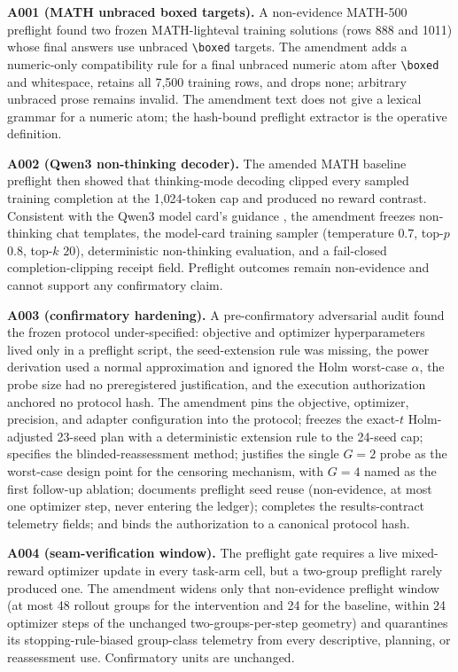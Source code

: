 \documentclass[11pt]{article}
\begin{document}
\textbf{A001 (MATH unbraced boxed targets).} A non-evidence MATH-500 preflight found two frozen MATH-lighteval training solutions (rows 888 and 1011) whose final answers use unbraced \verb|\boxed| targets. The amendment adds a numeric-only compatibility rule for a final unbraced numeric atom after \verb|\boxed| and whitespace, retains all 7{,}500 training rows, and drops none; arbitrary unbraced prose remains invalid. The amendment text does not give a lexical grammar for a numeric atom; the hash-bound preflight extractor is the operative definition.

\textbf{A002 (Qwen3 non-thinking decoder).} The amended MATH baseline preflight then showed that thinking-mode decoding clipped every sampled training completion at the 1{,}024-token cap and produced no reward contrast. Consistent with the Qwen3 model card's guidance \citep{qwen3report2025}, the amendment freezes non-thinking chat templates, the model-card training sampler (temperature $0.7$, top-$p$ $0.8$, top-$k$ $20$), deterministic non-thinking evaluation, and a fail-closed completion-clipping receipt field. Preflight outcomes remain non-evidence and cannot support any confirmatory claim.

\textbf{A003 (confirmatory hardening).} A pre-confirmatory adversarial audit found the frozen protocol under-specified: objective and optimizer hyperparameters lived only in a preflight script, the seed-extension rule was missing, the power derivation used a normal approximation and ignored the Holm worst-case $\alpha$, the probe size had no preregistered justification, and the execution authorization anchored no protocol hash. The amendment pins the objective, optimizer, precision, and adapter configuration into the protocol; freezes the exact-$t$ Holm-adjusted 23-seed plan with a deterministic extension rule to the 24-seed cap; specifies the blinded-reassessment method; justifies the single $G{=}2$ probe as the worst-case design point for the censoring mechanism, with $G{=}4$ named as the first follow-up ablation; documents preflight seed reuse (non-evidence, at most one optimizer step, never entering the ledger); completes the results-contract telemetry fields; and binds the authorization to a canonical protocol hash.

\textbf{A004 (seam-verification window).} The preflight gate requires a live mixed-reward optimizer update in every task-arm cell, but a two-group preflight rarely produced one. The amendment widens only that non-evidence preflight window (at most 48 rollout groups for the intervention and 24 for the baseline, within 24 optimizer steps of the unchanged two-groups-per-step geometry) and quarantines its stopping-rule-biased group-class telemetry from every descriptive, planning, or reassessment use. Confirmatory units are unchanged.
\end{document}
